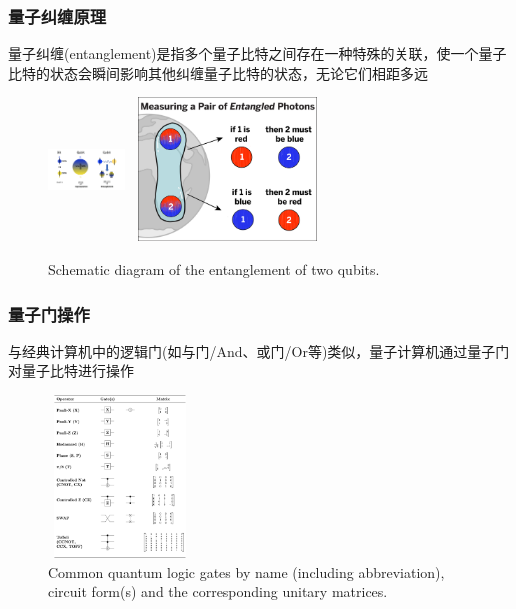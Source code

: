 \begin{frame}
    \frametitle{量子纠缠原理}
    量子纠缠\textrm{(entanglement)}是指多个量子比特之间存在一种特殊的关联，使一个量子比特的状态会瞬间影响其他纠缠量子比特的状态，无论它们相距多远
            \begin{figure}
        \centering
                \includegraphics[height=1.5in, width=0.8in, viewport=460 0 645 380,clip]{Figures/Illustration-of-a-bit_and_qubit.png}
                \includegraphics[height=1.5in, width=2.05in, viewport=0 0 980 775,clip]{Figures/Quantum_Entanglement_chart.png}
		\caption{\tiny{\textrm{Schematic diagram of the entanglement of two qubits.}}}
		\label{Fig:Illustration-of-a-qubit-entanglement}
            \end{figure}
	    \vskip -10pt
	    {\fontsize{7.5pt}{5.2pt}\selectfont{利用量子纠缠可以实现高效的信息传输和处理，是量子通信和量子计算的重要资源}}
\end{frame}

\begin{frame}
    \frametitle{量子门操作}
    与经典计算机中的逻辑门\textrm{(如与门/And、或门/Or等)}类似，量子计算机通过量子门对量子比特进行操作\\
{\fontsize{7.5pt}{5.2pt}}
    \begin{figure}
        \centering
                \includegraphics[height=1.7in, width=1.5in, viewport=0 0 390 430,clip]{Figures/Quantum_Logic_Gates.png}
		\caption{\tiny{\textrm{Common quantum logic gates by name (including abbreviation), circuit form(s) and the corresponding unitary matrices.}}}
		\label{Fig:Quantum_Logic_Gates}
    \end{figure}
\end{frame}

